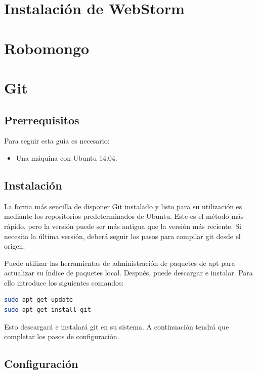 \section{Instalación de WebStorm}



\section{Robomongo}



\section{Git}


\subsection{Prerrequisitos}

Para seguir esta guía es necesario:
\begin{itemize}
\item{Una máquina con Ubuntu 14.04.}
\end{itemize}

\subsection{Instalación}

La forma más sencilla de disponer Git instalado y listo para su utilización es mediante los repositorios predeterminados de Ubuntu. Este es el método más rápido, pero la versión puede ser más antigua que la versión más reciente. Si necesita la última versión, deberá seguir los pasos para compilar git desde el origen.

Puede utilizar las herramientas de administración de paquetes de apt para actualizar su índice de paquetes local. Después, puede descargar e instalar. Para ello introduce los siguientes comandos:

\begin{lstlisting}[language=bash]
sudo apt-get update
sudo apt-get install git
\end{lstlisting}

Esto descargará e instalará git en su sistema. A continuación tendrá que completar los pasos de configuración.

\subsection{Configuración}

